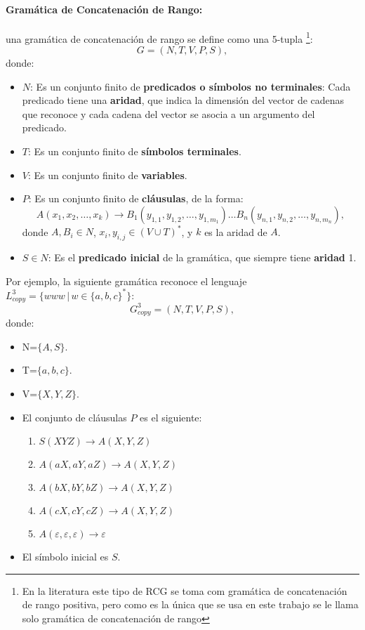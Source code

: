 \paragraph{Gramática de Concatenación de Rango:} una gramática de concatenación de rango se define como una 5-tupla
\footnote{En la literatura este tipo de RCG se toma com gramática de concatenación de rango positiva, pero como es la única que
    se usa en este trabajo se le llama solo gramática de concatenación de rango}:
\[
    G = (N, T, V, P, S),
\]
donde:

\begin{itemize}
    \item $N$: Es un conjunto finito de \textbf{predicados o símbolos no terminales}: Cada predicado tiene una \textbf{aridad}, que indica la dimensión del vector de cadenas que reconoce y cada cadena del vector se asocia a un argumento del predicado.
    \item $T$: Es un conjunto finito de \textbf{símbolos terminales}.
    \item $V$: Es un conjunto finito de \textbf{variables}.
    \item $P$: Es un conjunto finito de \textbf{cláusulas}, de la forma:
          \[
              A(x_1, x_2, \ldots, x_k) \to B_1(y_{1,1}, y_{1,2}, \ldots, y_{1,m_1}) \ldots B_n(y_{n,1}, y_{n,2}, \ldots, y_{n,m_n}),
          \]
          donde $A, B_i \in N$, $x_i, y_{i,j} \in (V \cup T)^*$, y $k$ es la aridad de $A$.
    \item $S \in N$: Es el \textbf{predicado inicial} de la gramática, que siempre tiene \textbf{aridad} 1.
\end{itemize}

Por ejemplo, la siguiente gramática reconoce el lenguaje $L^3_{copy}=\{www\,|\,w\in \{a,b,c\}^*\}$:
\label{g_3copy}
\[
    G^3_{copy} = (N, T, V, P, S),
\]
donde:

\begin{itemize}
    \item  N=$\{A,S\}$.
    \item T=$\{a,b,c\}$.
    \item V=$\{X,Y,Z\}$.
    \item El conjunto de cláusulas $P$ es el siguiente:
          \begin{enumerate}
              \item $S(XYZ)\to A(X,Y,Z)$
              \item $A(aX,aY,aZ)\to A(X,Y,Z)$
              \item $A(bX,bY,bZ)\to A(X,Y,Z)$
              \item $A(cX,cY,cZ)\to A(X,Y,Z)$
              \item $A(\varepsilon,\varepsilon,\varepsilon)\to \varepsilon$
          \end{enumerate}
    \item El símbolo inicial es $S$.
\end{itemize}


